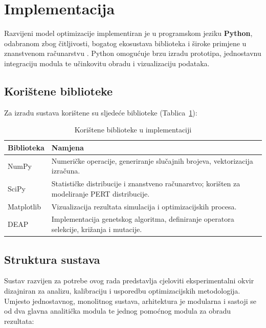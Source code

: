 
\section{Implementacija}

Razvijeni model optimizacije implementiran je u programskom jeziku \textbf{Python}, odabranom zbog čitljivosti, bogatog ekosustava biblioteka i široke primjene u znanstvenom računarstvu \cite{PythonSoftwareFoundation}. Python omogućuje brzu izradu prototipa, jednostavnu integraciju modula te učinkovitu obradu i vizualizaciju podataka.

\subsection{Korištene biblioteke}

Za izradu sustava korištene su sljedeće biblioteke (Tablica~\ref{tab:biblioteke}):

\begin{table}[H]
\centering
\caption{Korištene biblioteke u implementaciji}
\label{tab:biblioteke}
\begin{tabular}{|l|p{10cm}|}
\hline
\textbf{Biblioteka} & \textbf{Namjena} \\ \hline
NumPy & Numeričke operacije, generiranje slučajnih brojeva, vektorizacija izračuna. \\ \hline
SciPy & Statističke distribucije i znanstveno računarstvo; korišten za modeliranje PERT distribucije. \\ \hline
Matplotlib & Vizualizacija rezultata simulacija i optimizacijskih procesa. \\ \hline
DEAP & Implementacija genetskog algoritma, definiranje operatora selekcije, križanja i mutacije. \\ \hline
\end{tabular}
\end{table}

\subsection{Struktura sustava}


Sustav razvijen za potrebe ovog rada predstavlja cjeloviti eksperimentalni okvir dizajniran za analizu, kalibraciju i usporedbu optimizacijskih metodologija. Umjesto jednostavnog, monolitnog sustava, arhitektura je modularna i sastoji se od dva glavna analitička modula te jednog pomoćnog modula za obradu rezultata:

